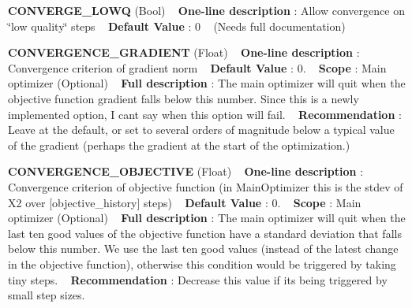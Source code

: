 \begin{DoxyItemize}
\item {\bfseries  C\+O\+N\+V\+E\+R\+G\+E\+\_\+\+L\+O\+WQ } (Bool) ~\newline
{\bfseries  One-\/line description }\+: Allow convergence on \char`\"{}low quality\char`\"{} steps ~\newline
{\bfseries  Default Value }\+: 0 ~\newline
(Needs full documentation)\end{DoxyItemize}
\begin{DoxyItemize}
\item {\bfseries  C\+O\+N\+V\+E\+R\+G\+E\+N\+C\+E\+\_\+\+G\+R\+A\+D\+I\+E\+NT } (Float) ~\newline
{\bfseries  One-\/line description }\+: Convergence criterion of gradient norm ~\newline
{\bfseries  Default Value }\+: 0. ~\newline
{\bfseries  Scope }\+: Main optimizer (Optional) ~\newline
{\bfseries  Full description }\+: The main optimizer will quit when the objective function gradient falls below this number. Since this is a newly implemented option, I can\textquotesingle{}t say when this option will fail. ~\newline
{\bfseries  Recommendation }\+: Leave at the default, or set to several orders of magnitude below a typical value of the gradient (perhaps the gradient at the start of the optimization.)\end{DoxyItemize}
\begin{DoxyItemize}
\item {\bfseries  C\+O\+N\+V\+E\+R\+G\+E\+N\+C\+E\+\_\+\+O\+B\+J\+E\+C\+T\+I\+VE } (Float) ~\newline
{\bfseries  One-\/line description }\+: Convergence criterion of objective function (in Main\+Optimizer this is the stdev of X2 over \mbox{[}objective\+\_\+history\mbox{]} steps) ~\newline
{\bfseries  Default Value }\+: 0. ~\newline
{\bfseries  Scope }\+: Main optimizer (Optional) ~\newline
{\bfseries  Full description }\+: The main optimizer will quit when the last ten good values of the objective function have a standard deviation that falls below this number. We use the last ten good values (instead of the latest change in the objective function), otherwise this condition would be triggered by taking tiny steps. ~\newline
{\bfseries  Recommendation }\+: Decrease this value if it\textquotesingle{}s being triggered by small step sizes.\end{DoxyItemize}
